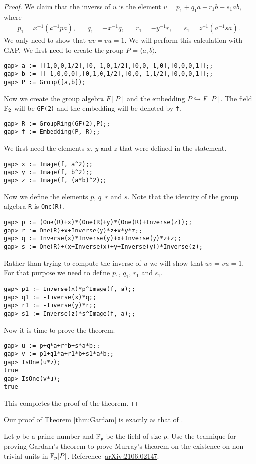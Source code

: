 \begin{proof}
    We claim that the inverse of $u$ 
    is the element $v=p_1+q_1a+r_1b+s_1ab$, where
    \begin{align*}
        p_1=x^{-1}(a^{-1}pa), 
        && q_1=-x^{-1}q,
        && r_1=-y^{-1}r,
        && s_1=z^{-1}(a^{-1}sa).
    \end{align*}
    We only need to show that $uv=vu=1$. We will perform this
    calculation with \textsf{GAP}. 
    We first need to create the group $P=\langle a,b\rangle$. 
\begin{lstlisting} 
gap> a := [[1,0,0,1/2],[0,-1,0,1/2],[0,0,-1,0],[0,0,0,1]];;
gap> b := [[-1,0,0,0],[0,1,0,1/2],[0,0,-1,1/2],[0,0,0,1]];;
gap> P := Group([a,b]);
\end{lstlisting}
    Now we create the group algebra $F[P]$ and 
    the embedding $P\hookrightarrow F[P]$.  
    The field $\mathbb{F}_2$ will be \lstinline{GF(2)} 
    and the embedding will be denoted by \lstinline{f}. 
\begin{lstlisting}
gap> R := GroupRing(GF(2),P);;
gap> f := Embedding(P, R);;
\end{lstlisting}
    We first need the elements $x$, $y$ and $z$ that were defined in the
    statement.
\begin{lstlisting}
gap> x := Image(f, a^2);;
gap> y := Image(f, b^2);;
gap> z := Image(f, (a*b)^2);;
\end{lstlisting}
    Now we define the elements $p$, $q$, $r$ and $s$. Note that
    the identity of the group algebra \lstinline{R} 
    is \lstinline{One(R)}. 
\begin{lstlisting}
gap> p := (One(R)+x)*(One(R)+y)*(One(R)+Inverse(z));;
gap> r := One(R)+x+Inverse(y)*z+x*y*z;;
gap> q := Inverse(x)*Inverse(y)+x+Inverse(y)*z+z;;
gap> s := One(R)+(x+Inverse(x)+y+Inverse(y))*Inverse(z);
\end{lstlisting}
    Rather than trying 
    to compute the inverse of $u$ we will show that 
    $uv=vu=1$. For that purpose we need to define
    $p_1$, $q_1$, $r_1$ and $s_1$.
\begin{lstlisting}
gap> p1 := Inverse(x)*p^Image(f, a);;
gap> q1 := -Inverse(x)*q;;
gap> r1 := -Inverse(y)*r;;
gap> s1 := Inverse(z)*s^Image(f, a);;
\end{lstlisting}
Now it is time to prove the theorem. 
\begin{lstlisting}
gap> u := p+q*a+r*b+s*a*b;;
gap> v := p1+q1*a+r1*b+s1*a*b;;
gap> IsOne(u*v);
true
gap> IsOne(v*u);
true
\end{lstlisting}
This completes the proof of the theorem. 
\end{proof}

Our proof of Theorem \ref{thm:Gardam} is exactly 
as that of \cite{MR4334981}. 

\begin{bonus}
     Let $p$ be a prime number and $\mathbb{F}_p$ be the field of size $p$. 
     Use the technique 
     for proving Gardam's theorem to prove Murray's theorem
     on the existence 
     on non-trivial units in $\mathbb{F}_p[P]$. 
     Reference: \href{https://arxiv.org/abs/2106.02147}{arXiv:2106.02147}. 
\end{bonus}



